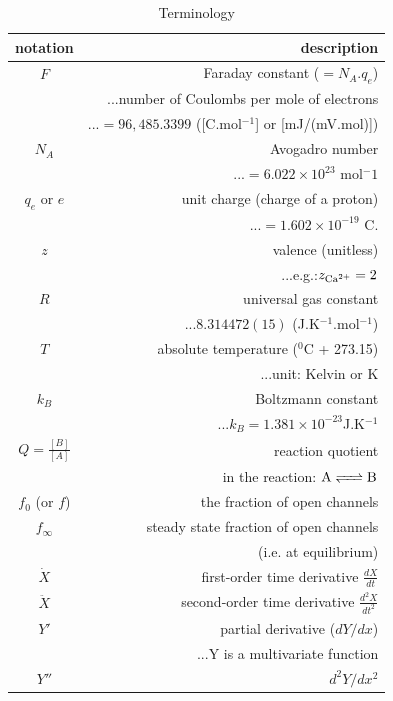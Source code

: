 \begin{table}[!hbt]
  \begin{center}
    \caption{Terminology}
    \begin{tabular}{cr} 
      \hline
      notation & description \\ 
      \hline\hline
      $F$ & Faraday constant ($=N_A.q_e$) \\
      & ...number of Coulombs per mole of electrons \\
      & ...$=96,485.3399$ ([C.mol$^{-1}$] or [mJ/(mV.mol)]) \\
      $N_A$ & Avogadro number \\
      & ...$=6.022\times 10^{23}$ mol$^-1$\\
      $q_e$ or $e$ & unit charge (charge of a proton) \\
      & ...$=1.602 \times 10^{-19}$ C. \\
      $z$ & valence (unitless) \\
      & ...e.g.:$z_{\text{Ca}^{2+}}=2$ \\
      $R$ & universal gas constant \\
      & ...$8.314472(15)$ (J.K$^{-1}$.mol$^{-1}$) \\
      $T$ & absolute temperature ($^0$C + 273.15) \\
      & ...unit: Kelvin or K \\
      $k_B$ & Boltzmann constant \\
      & ...$k_B=1.381\times 10^{-23}$J.K$^{-1}$ \\
      $Q=\frac{[B]}{[A]}$ & reaction quotient \\
      & in the reaction: $\ce{A <=> B}$ \\
      $f_0$ (or $f$)& the fraction of open channels \\
      $f_\infty$ & steady state fraction of open channels\\
      & (i.e. at equilibrium)\\
      $\dot{X}$ & first-order time derivative $\frac{dX}{dt}$ \\
      $\ddot{X}$ & second-order time derivative $\frac{d^2X}{dt^2}$\\
      $Y'$ & partial derivative ($dY/dx$) \\
      & ...Y is a multivariate function \\
      $Y''$ & $d^2Y/dx^2$ \\
    \end{tabular}
  \end{center}
  \label{tab:Term_3}
\end{table}

